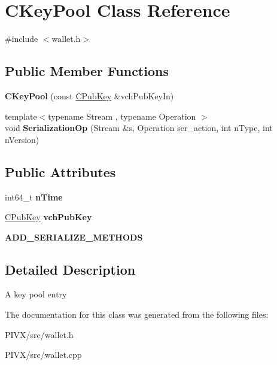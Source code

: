 \hypertarget{class_c_key_pool}{}\section{C\+Key\+Pool Class Reference}
\label{class_c_key_pool}


{\ttfamily \#include $<$wallet.\+h$>$}

\subsection*{Public Member Functions}
\begin{DoxyCompactItemize}
\item 
\mbox{\label{class_c_key_pool_a63e27cd41ea374cc909436b3083b68c4}} 
{\bfseries C\+Key\+Pool} (const \mbox{\hyperlink{class_c_pub_key}{C\+Pub\+Key}} \&vch\+Pub\+Key\+In)
\item 
\mbox{\label{class_c_key_pool_a2589572f0eb90da9237684a16484c03d}} 
{\footnotesize template$<$typename Stream , typename Operation $>$ }\\void {\bfseries Serialization\+Op} (Stream \&s, Operation ser\+\_\+action, int n\+Type, int n\+Version)
\end{DoxyCompactItemize}
\subsection*{Public Attributes}
\begin{DoxyCompactItemize}
\item 
\mbox{\label{class_c_key_pool_aa2f8263f0baf732ad5b4e4b59b482209}} 
int64\+\_\+t {\bfseries n\+Time}
\item 
\mbox{\label{class_c_key_pool_a937080a4cec1f2b138ebd200557c82b5}} 
\mbox{\hyperlink{class_c_pub_key}{C\+Pub\+Key}} {\bfseries vch\+Pub\+Key}
\item 
\mbox{\label{class_c_key_pool_ad4bc93c36031a3e6306c102008be5f51}} 
{\bfseries A\+D\+D\+\_\+\+S\+E\+R\+I\+A\+L\+I\+Z\+E\+\_\+\+M\+E\+T\+H\+O\+DS}
\end{DoxyCompactItemize}


\subsection{Detailed Description}
A key pool entry 

The documentation for this class was generated from the following files\+:\begin{DoxyCompactItemize}
\item 
P\+I\+V\+X/src/wallet.\+h\item 
P\+I\+V\+X/src/wallet.\+cpp\end{DoxyCompactItemize}
